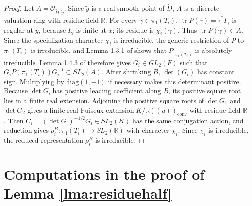 \documentclass{article}
\DeclareMathOperator{\tr}{tr}
\theoremstyle{plain}
\theoremstyle{definition}
\theoremstyle{plain}
\theoremstyle{plain}
\theoremstyle{plain}
\theoremstyle{remark}
\theoremstyle{remark}
\theoremstyle{plain}
\theoremstyle{plain}
\theoremstyle{plain}
\theoremstyle{plain}
\begin{document}
\begin{proof}
\medskip

Let $A = \mathcal O_{\widetilde D, \widetilde y}$. Since $\widetilde y$ is a real smooth point of $\widetilde D$, $A$ is a discrete valuation ring with residue field $\mathbb R$. For every $\gamma \in \pi_1(T_i)$, $\tr P(\gamma) = \widetilde\tau^{*}I_\gamma$ is regular at $\widetilde y$, because $I_\gamma$ is finite at $x$; its residue is $\chi_i(\gamma)$. Thus $\tr P(\gamma) \in A$. Since the specialization character $\chi_i$ is irreducible, the generic restriction of $P$ to $\pi_1(T_i)$ is irreducible, and Lemma 1.3.1 of \cite{cullershalen} shows that $P|_{\pi_1(T_i)}$ is absolutely irreducible. Lemma 1.4.3 of \cite{cullershalen} therefore gives $G_i \in GL_2(F)$ such that $G_iP(\pi_1(T_i))G_i^{-1} \subset SL_2(A)$. After shrinking $B$, $\det(G_i)$ has constant sign. Multiplying by $\mathrm{diag}(1, -1)$ if necessary makes this determinant positive. Because $\det G_i$ has positive leading coefficient along $B$, its positive square root lies in a finite real extension. Adjoining the positive square roots of $\det G_1$ and $\det G_2$ gives a finite real Puiseux extension $K/\mathbb R((u))_{\mathrm{conv}}$ with residue field $\mathbb R$. Then $C_i = (\det G_i)^{-1/2}G_i \in SL_2(K)$ has the same conjugation action, and reduction gives $\rho_i^B: \pi_1(T_i) \to SL_2(\mathbb{R})$ with character $\chi_i$. Since $\chi_i$ is irreducible, the reduced representation $\rho_i^B$ is irreducible.
\end{proof}

\section{Computations in the proof of Lemma \ref{lma:residuehalf}}
\end{document}
